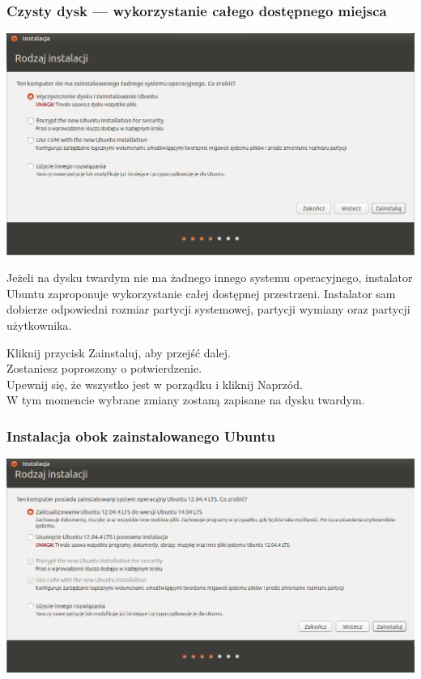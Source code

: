 \subsubsection{Czysty dysk --- wykorzystanie całego dostępnego miejsca}
\begin{center}
	\includegraphics[width=\linewidth]{images/instalator_partycjonowanie_proste.png}
\end{center}

Jeżeli na dysku twardym nie ma żadnego innego systemu operacyjnego, instalator Ubuntu zaproponuje wykorzystanie całej dostępnej przestrzeni. Instalator sam dobierze odpowiedni rozmiar partycji systemowej, partycji wymiany oraz partycji użytkownika.
\begin{flushright}
Kliknij przycisk \textcolor{ubuntu_orange}{Zainstaluj}, aby przejść dalej.\\
Zostaniesz poproszony o potwierdzenie.\\
Upewnij się, że wszystko jest w porządku i kliknij \textcolor{ubuntu_orange}{Naprzód}.\\
W tym momencie wybrane zmiany zostaną zapisane na dysku twardym.
\end{flushright}
\clearpage
\subsubsection{Instalacja obok zainstalowanego Ubuntu}
\begin{center}
	\includegraphics[width=\linewidth]{images/instalator_partycjonowanie_obok_ubuntu.png}
\end{center}

